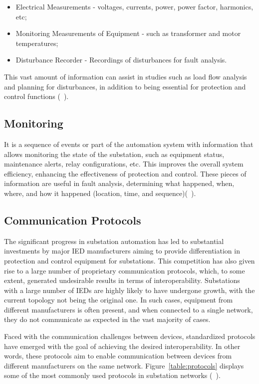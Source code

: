 \begin{itemize}
	\item Electrical Measurements - voltages, currents, power, power factor, harmonics, etc;
	\item Monitoring Measurements of Equipment - such as transformer and motor temperatures;
	\item Disturbance Recorder - Recordings of disturbances for fault analysis.
\end{itemize}

This vast amount of information can assist in studies such as load flow analysis and planning for disturbances, in addition to being essential for protection and control functions (~\cite{NormaIEC61850}).

\subsection{Monitoring}
It is a sequence of events or part of the automation system with information that allows monitoring the state of the substation, such as equipment status, maintenance alerts, relay configurations, etc. This improves the overall system efficiency, enhancing the effectiveness of protection and control. These pieces of information are useful in fault analysis, determining what happened, when, where, and how it happened (location, time, and sequence)(~\cite{NormaIEC61850}).

\subsection{Communication Protocols}
The significant progress in substation automation has led to substantial investments by major IED manufacturers aiming to provide differentiation in protection and control equipment for substations. This competition has also given rise to a large number of proprietary communication protocols, which, to some extent, generated undesirable results in terms of interoperability. Substations with a large number of IEDs are highly likely to have undergone growth, with the current topology not being the original one. In such cases, equipment from different manufacturers is often present, and when connected to a single network, they do not communicate as expected in the vast majority of cases.

Faced with the communication challenges between devices, standardized protocols have emerged with the goal of achieving the desired interoperability. In other words, these protocols aim to enable communication between devices from different manufacturers on the same network. Figure~\ref{table:protocols} displays some of the most commonly used protocols in substation networks (~\cite{NormaIEC61850}).

